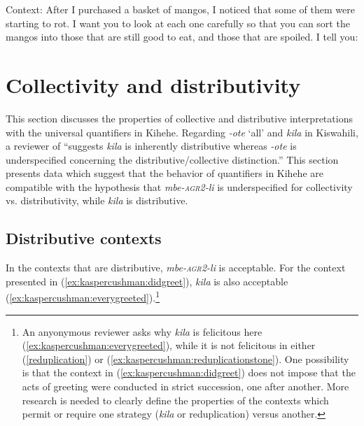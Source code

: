 \documentclass[output=paper,modfonts,nonflat]{langsci/langscibook}
\begin{document}
\begin{exe}

 \ex Context: After I purchased a basket of mangos, I noticed that some of them were starting to rot. I want you to look at each one carefully so that you can sort the mangos into those that are still good to eat, and those that are spoiled. I tell you: \label{ex:kaspercushman:onebyone} \\

\begin{xlist}


\end{xlist}
\end{exe}


\section{Collectivity and distributivity}

This section discusses the properties of collective and distributive interpretations with the universal quantifiers in Kihehe. 
Regarding \textit{-ote} `all' and \textit{kila} in Kiswahili, a reviewer of \citealt[396]{zerbian08} ``suggests \textit{kila} is inherently distributive whereas \textit{-ote} is underspecified concerning the distributive/collective distinction.''  This section presents data which suggest that the behavior of quantifiers in Kihehe are compatible with the hypothesis that \textit{mbe-\textsc{agr2}-li} is underspecified for collectivity vs. distributivity, while \textit{kila} is distributive.

\subsection{Distributive contexts}

In the contexts that are distributive, \textit{mbe-\textsc{agr2}-li} is acceptable. For the context presented in (\ref{ex:kaspercushman:didgreet}), \textit{kila} is also acceptable (\ref{ex:kaspercushman:everygreeted}).\footnote{An anyonymous reviewer asks why \textit{kila} is felicitous here (\ref{ex:kaspercushman:everygreeted}), while it is not felicitous in either (\ref{reduplication}) or (\ref{ex:kaspercushman:reduplicationstone}). One possibility is that the context in (\ref{ex:kaspercushman:didgreet}) does not impose that the acts of greeting were conducted in strict succession, one after another.  More research is needed to clearly define the properties of the contexts which permit or require one strategy (\textit{kila} or reduplication) versus another.} 
\end{document}
